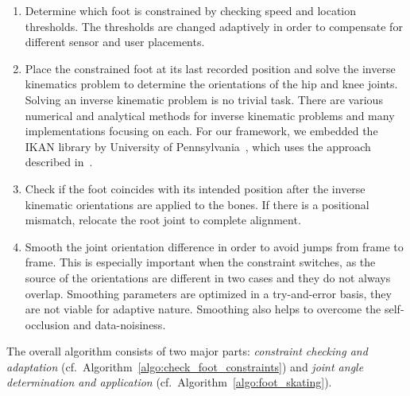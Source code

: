 \begin{enumerate}
\item Determine which foot is constrained by checking speed and location thresholds. The thresholds are changed adaptively in order to compensate for different sensor and user placements.

\item Place the constrained foot at its last recorded position and solve the inverse kinematics problem to determine the orientations of the hip and knee joints. Solving an inverse kinematic problem is no trivial task. There are various numerical and analytical methods for inverse kinematic problems and many implementations focusing on each. For our framework, we embedded the IKAN library by University of Pennsylvania~\cite{IKAN2013}, which uses the approach described in~\cite{Tolani2000}.  

\item Check if the foot coincides with its intended position after the inverse kinematic orientations are applied to the bones. If there is a positional mismatch, relocate the root joint to complete alignment.

\item Smooth the joint orientation difference in order to avoid jumps from frame to frame. This is especially important when the constraint switches, as the source of the orientations are different in two cases and they do not always overlap. Smoothing parameters are optimized in a try-and-error basis, they are not viable for adaptive nature. Smoothing also helps to overcome the self-occlusion and data-noisiness.
\end{enumerate}

The overall algorithm consists of two major parts: {\em constraint checking and adaptation} (cf.~Algorithm~\ref{algo:check_foot_constraints}) and {\em joint angle determination and application} (cf.~Algorithm~\ref{algo:foot_skating}).  

